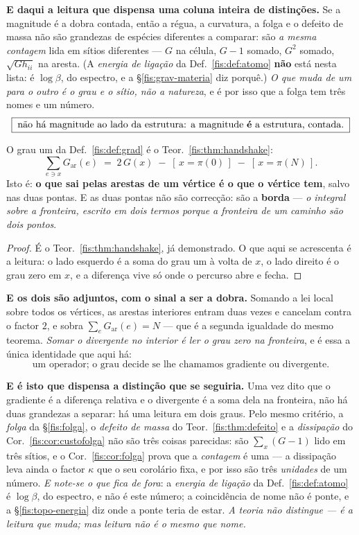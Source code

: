 \documentclass[livro.tex]{subfiles}
\begin{document}
\medskip\noindent\textbf{E daqui a leitura que dispensa uma coluna inteira de
distinções.} Se a magnitude é a dobra contada, então a régua, a curvatura, a
folga e o defeito de massa não são grandezas de espécies diferentes a comparar:
são \emph{a mesma contagem} lida em sítios diferentes --- $G$ na célula, $G-1$
somado, $G^{2}$ somado, $\sqrt{G h_{ii}}$ na aresta. (A \emph{energia de
ligação} da Def.~\ref{fis:def:atomo} \textbf{não} está nesta lista: é $\log\beta$,
do espectro, e a §\ref{fis:grav-materia} diz porquê.) \emph{O que muda de um para
o outro é o grau e o sítio, não a natureza}, e é por isso que a folga tem três
nomes e um número.
\[
\boxed{\;\text{não há magnitude ao lado da estrutura: a magnitude \textbf{é} a estrutura, contada.}\;}
\]

\begin{teorema}\label{fis:thm:divergente}
O grau um da Def.~\ref{fis:def:grad} é o Teor.~\ref{fis:thm:handshake}:
\[
\sum_{e\ni x}G_{\mathrm{ar}}(e)\;=\;2\,G(x)\;-\;[\,x=\pi(0)\,]\;-\;[\,x=\pi(N)\,] .
\]
Isto é: \textbf{o que sai pelas arestas de um vértice é o que o vértice tem},
salvo nas duas pontas. E as duas pontas não são correcção: são a \textbf{borda}
--- \emph{o integral sobre a fronteira, escrito em dois termos porque a fronteira
de um caminho são dois pontos}.
\end{teorema}

\begin{proof}
É o Teor.~\ref{fis:thm:handshake}, já demonstrado. O que aqui se acrescenta é a
leitura: o lado esquerdo é a soma do grau um à volta de $x$, o lado direito é o
grau zero em $x$, e a diferença vive só onde o percurso abre e fecha.
\end{proof}

\medskip\noindent\textbf{E os dois são adjuntos, com o sinal a ser a dobra.}
Somando a lei local sobre todos os vértices, as arestas interiores entram duas
vezes e cancelam contra o factor $2$, e sobra $\sum_e G_{\mathrm{ar}}(e)=N$ ---
que é a segunda igualdade do mesmo teorema. \emph{Somar o divergente no interior
é ler o grau zero na fronteira}, e é essa a única identidade que aqui há:
\[
\boxed{\;\text{um operador; o grau decide se lhe chamamos gradiente ou divergente.}\;}
\]

\medskip\noindent\textbf{E é isto que dispensa a distinção que se seguiria.} Uma
vez dito que o gradiente é a diferença relativa e o divergente é a soma dela na
fronteira,
não há duas grandezas a separar: há uma leitura em dois graus. Pelo mesmo
critério, a \emph{folga} da §\ref{fis:folga}, o \emph{defeito de massa} do
Teor.~\ref{fis:thm:defeito} e a \emph{dissipação} do
Cor.~\ref{fis:cor:custofolga} não são três coisas parecidas: são $\sum_x(G-1)$
lido em três sítios, e o Cor.~\ref{fis:cor:folga} prova que a \emph{contagem} é
uma --- a dissipação leva ainda o factor $\kappa$ que o seu corolário fixa, e por
isso são três \emph{unidades} de um número. \emph{E note-se o que fica de fora}:
a \emph{energia de ligação} da Def.~\ref{fis:def:atomo} é $\log\beta$, do
espectro, e não é este número; a coincidência de nome não é ponte, e a
§\ref{fis:topo-energia} diz onde a ponte teria de estar.
\emph{A teoria não distingue --- é a leitura que muda; mas leitura não é o mesmo
que nome.}
\end{document}
